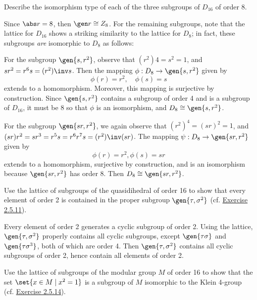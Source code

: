 \begin{exercise}\label{ex2.5.15}
    Describe the isomorphism type of each of the three subgroups of $D_{16}$ of order 8.
\end{exercise}

\begin{sol}
    Since $\abs r = 8$, then $\gen r \cong Z_8$. For the remaining subgroups, note that the lattice for $D_{16}$ shows a striking similarity to the lattice for $D_8$; in fact, these subgroups \emph{are} isomorphic to $D_8$ as follows:
    
    For the subgroup $\gen{s, r^2}$, observe that $(r^2)4 = s^2 = 1$, and $sr^2 = r^6s = (r^2)\inv s$. Then the mapping $\phi : D_8 \to \gen{s, r^2}$ given by
    \[\phi(r) = r^2, \quad \phi(s) = s\]
    extends to a homomorphism. Moreover, this mapping is surjective by construction. Since $\gen{s, r^2}$ contains a subgroup of order 4 and is a subgroup of $D_{16}$, it must be 8 so that $\phi$ is an isomorphism, and $D_8 \cong \gen{s, r^2}$.
    
    For the subgroup $\gen{sr, r^2}$, we again observe that $(r^2)^4 = (sr)^2 = 1$, and $(sr)r^2 = sr^3 = r^5s = r^6r^7s = (r^2)\inv(sr)$. The mapping $\psi : D_8 \to \gen{sr, r^2}$ given by
    \[\phi(r) = r^2, \phi(s) = sr\]
    extends to a homomorphism, surjective by construction, and is an isomorphism because $\gen{sr, r^2}$ has order 8. Then $D_8 \cong \gen{sr, r^2}$.
\end{sol}

\begin{exercise}\label{ex2.5.16}
    Use the lattice of subgroups of the quasidihedral of order 16 to show that every element of order 2 is contained in the proper subgroup $\gen{\tau, \sigma^2}$ (cf. \hyperref[ex2.5.11]{Exercise 2.5.11}).
\end{exercise}

\begin{sol}
    Every element of order 2 generates a cyclic subgroup of order 2. Using the lattice, $\gen{\tau, \sigma^2}$ properly contains all cyclic subgroups, except $\gen{\tau\sigma}$ and $\gen{\tau\sigma^3}$, both of which are order 4. Then $\gen{\tau, \sigma^2}$ contains all cyclic subgroups of order 2, hence contain all elements of order 2.
\end{sol}

\begin{exercise}\label{ex2.5.17}
    Use the lattice of subgroups of the modular group $M$ of order 16 to show that the set $\set{x \in M \mid x^2 = 1}$ is a subgroup of $M$ isomorphic to the Klein 4-group (cf. \hyperref[ex2.5.14]{Exercise 2.5.14}).
\end{exercise}

